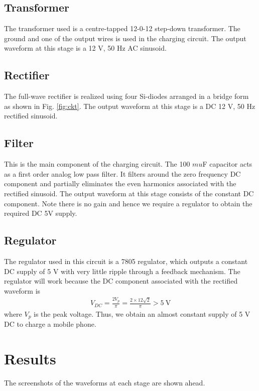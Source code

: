 \documentclass[journal,12pt,twocolumn]{IEEEtran}
\begin{document}
\subsection{Transformer}
The transformer used is a centre-tapped 12-0-12 step-down 
transformer. The ground and one of the output wires is used
in the charging circuit. The output waveform at this stage is
a 12 V, 50 Hz AC sinusoid.

\subsection{Rectifier}
The full-wave rectifier is realized using four Si-diodes arranged in a
bridge form as shown in Fig. \ref{fig:ckt}. The output waveform at this
stage is a DC 12 V, 50 Hz rectified sinusoid.

\subsection{Filter}
This is the main component of the charging circuit. The 100 $mu$F
capacitor acts as a first order analog low pass filter. It filters
around the zero frequency DC component and partially eliminates the
even harmonics associated with the rectified sinusoid. The output 
waveform at this stage consists of the constant DC component. Note
there is no gain and hence we require a regulator to obtain the
required DC 5V supply.

\subsection{Regulator}
The regulator used in this circuit is a 7805 regulator, which outputs
a constant DC supply of 5 V with very little ripple through a 
feedback mechanism. The regulator will work because the DC component 
associated with the rectified waveform is
\begin{align}
	V_{DC} = \frac{2V_p}{\pi} = \frac{2\times12\sqrt{2}}{\pi} > \SI{5}{\V}
\end{align}
where $V_p$ is the peak voltage. Thus, we obtain an almost
constant supply of 5 V DC to charge a mobile phone.

\section{Results}
The screenshots of the waveforms at each stage are shown ahead.
\end{document}
